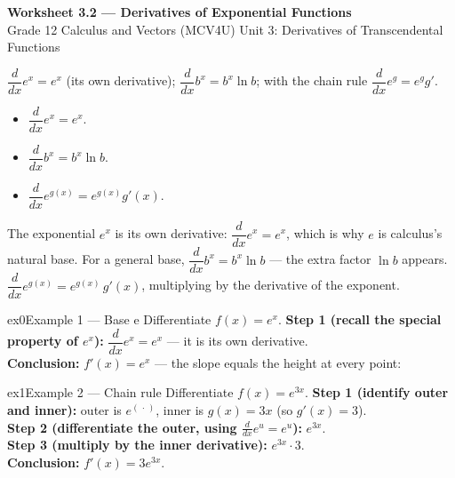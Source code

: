 \documentclass[11pt]{article}
\begin{document}
\begin{center}
{\LARGE\bfseries\color{titleblue}Worksheet 3.2 --- Derivatives of Exponential Functions}\\[2pt]
{\small Grade 12 Calculus and Vectors (MCV4U) \textperiodcentered{} Unit 3: Derivatives of Transcendental Functions}
\end{center}

\begin{ideabox}
$\dfrac{d}{dx}e^x=e^x$ (its own derivative); $\dfrac{d}{dx}b^x=b^x\ln b$; with the chain rule $\dfrac{d}{dx}e^{g}=e^{g}g'$.
\begin{itemize}[leftmargin=*,itemsep=2pt]
  \item $\dfrac{d}{dx}e^x=e^x$.
  \item $\dfrac{d}{dx}b^x=b^x\ln b$.
  \item $\dfrac{d}{dx}e^{g(x)}=e^{g(x)}g'(x)$.
\end{itemize}
\end{ideabox}

\begin{learnbox}
The exponential $e^x$ is its own derivative: $\dfrac{d}{dx}e^x=e^x$, which is why $e$ is calculus's natural base.
For a general base, $\dfrac{d}{dx}b^x=b^x\ln b$ — the extra factor $\ln b$ appears.
$\dfrac{d}{dx}e^{g(x)}=e^{g(x)}\,g'(x)$, multiplying by the derivative of the exponent.
\end{learnbox}


\begin{example}{ex0}{Example 1 --- Base e}
Differentiate $f(x)=e^x$.\soln
\textbf{Step 1 (recall the special property of $e^x$):} $\dfrac{d}{dx}e^x=e^x$ --- it is its own derivative.\\[3pt]
\textbf{Conclusion:} $f'(x)=e^x$ --- the slope equals the height at every point:
\end{example}

\begin{example}{ex1}{Example 2 --- Chain rule}
Differentiate $f(x)=e^{3x}$.\soln
\textbf{Step 1 (identify outer and inner):} outer is $e^{(\,\cdot\,)}$, inner is $g(x)=3x$ (so $g'(x)=3$).\\[3pt]
\textbf{Step 2 (differentiate the outer, using $\frac{d}{dx}e^{u}=e^{u}$):} $e^{3x}$.\\[3pt]
\textbf{Step 3 (multiply by the inner derivative):} $e^{3x}\cdot3$.\\[3pt]
\textbf{Conclusion:} $f'(x)=3e^{3x}$.
\end{example}
\end{document}
